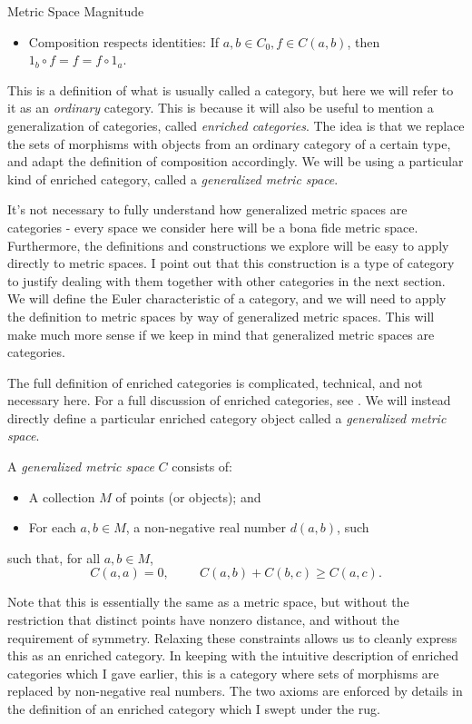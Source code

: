 \documentclass[12pt]{pom_thesis}
\begin{document}
\begin{chapter}{Metric Space Magnitude}
\begin{defn}
\begin{itemize}
\item Composition respects identities: If $a,b \in C_0, f \in C(a,b)$, then $1_b \circ f = f = f \circ 1_a$.
\end{itemize}
\end{defn}
This is a definition of what is usually called a category, but here we will refer to it as an \emph{ordinary} category. This is because it will also be useful to mention a generalization of categories, called \emph{enriched categories}. The idea is that we replace the sets of morphisms with objects from an ordinary category of a certain type, and adapt the definition of composition accordingly. We will be using a particular kind of enriched category, called a \textit{generalized metric space}.

It's not necessary to fully understand how generalized metric spaces are categories - every space we consider here will be a bona fide metric space. Furthermore, the definitions and constructions we explore will be easy to apply directly to metric spaces. I point out that this construction is a type of category to justify dealing with them together with other categories in the next section. We will define the Euler characteristic of a category, and we will need to apply the definition to metric spaces by way of generalized metric spaces. This will make much more sense if we keep in mind that generalized metric spaces are categories.

The full definition of enriched categories is complicated, technical, and not necessary here. For a full discussion of enriched categories, see \cite{Kelly1}. We will instead directly define a particular enriched category object called a \emph{generalized metric space}.
\begin{defn}
A \emph{generalized metric space} $C$ consists of:
\begin{itemize}
\item A collection $M$ of points (or objects); and
\item For each $a,b \in M$, a non-negative real number $d(a,b)$, such
\end{itemize}
such that, for all $a,b \in M$,
\[C(a,a) = 0,\hspace{1cm} C(a,b) + C(b,c) \geq C(a,c).
\]
\end{defn}
Note that this is essentially the same as a metric space, but without the restriction that distinct points have nonzero distance, and without the requirement of symmetry. Relaxing these constraints allows us to cleanly express this as an enriched category. In keeping with the intuitive description of enriched categories which I gave earlier, this is a category where sets of morphisms are replaced by non-negative real numbers. The two axioms are enforced by details in the definition of an enriched category which I swept under the rug.


\end{chapter}
\end{document}
